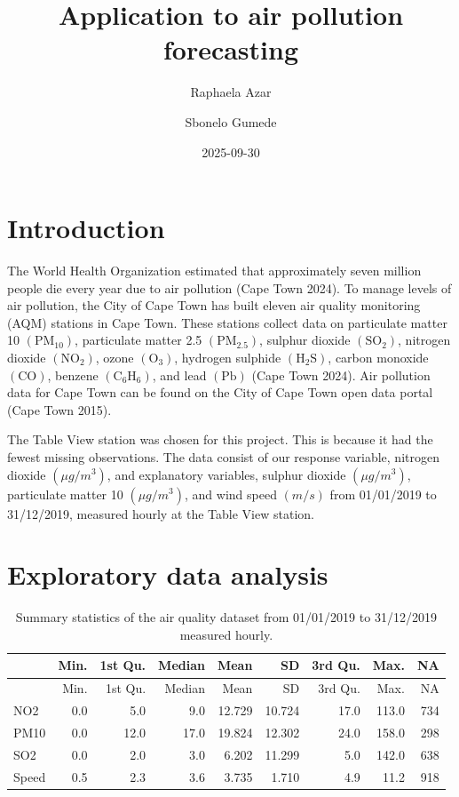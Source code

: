 \documentclass[
]{article}
\title{Application to air pollution forecasting}
\author{Raphaela Azar \and Sbonelo Gumede}
\date{2025-09-30}
\begin{document}
\maketitle

\section{Introduction}\label{introduction}

The World Health Organization estimated that approximately seven million
people die every year due to air pollution (Cape Town 2024). To manage
levels of air pollution, the City of Cape Town has built eleven air
quality monitoring (AQM) stations in Cape Town. These stations collect
data on particulate matter 10 \((\text{PM}_{10})\), particulate matter
2.5 \((\text{PM}_{2.5})\), sulphur dioxide \((\text{SO}_{2})\), nitrogen
dioxide \((\text{NO}_{2})\), ozone \((\text{O}_{3})\), hydrogen sulphide
\((\text{H}_{2}\text{S})\), carbon monoxide \((\text{CO})\), benzene
\((\text{C}_{6}\text{H}_{6})\), and lead \((\text{Pb})\) (Cape Town
2024). Air pollution data for Cape Town can be found on the City of Cape
Town open data portal (Cape Town 2015).

The Table View station was chosen for this project. This is because it
had the fewest missing observations. The data consist of our response
variable, nitrogen dioxide \((\mu g / m^3)\), and explanatory variables,
sulphur dioxide \((\mu g / m^3)\), particulate matter 10
\((\mu g / m^3)\), and wind speed \((m/s)\) from 01/01/2019 to
31/12/2019, measured hourly at the Table View station.

\section{Exploratory data analysis}\label{exploratory-data-analysis}

\begin{longtable}[]{@{}lrrrrrrrr@{}}
\caption{Summary statistics of the air quality dataset from 01/01/2019
to 31/12/2019 measured hourly.}\tabularnewline
\toprule\noalign{}
& Min. & 1st Qu. & Median & Mean & SD & 3rd Qu. & Max. & NA \\
\midrule\noalign{}
\endfirsthead
\toprule\noalign{}
& Min. & 1st Qu. & Median & Mean & SD & 3rd Qu. & Max. & NA \\
\midrule\noalign{}
\endhead
\bottomrule\noalign{}
\endlastfoot
NO2 & 0.0 & 5.0 & 9.0 & 12.729 & 10.724 & 17.0 & 113.0 & 734 \\
PM10 & 0.0 & 12.0 & 17.0 & 19.824 & 12.302 & 24.0 & 158.0 & 298 \\
SO2 & 0.0 & 2.0 & 3.0 & 6.202 & 11.299 & 5.0 & 142.0 & 638 \\
Speed & 0.5 & 2.3 & 3.6 & 3.735 & 1.710 & 4.9 & 11.2 & 918 \\
\end{longtable}
\end{document}
